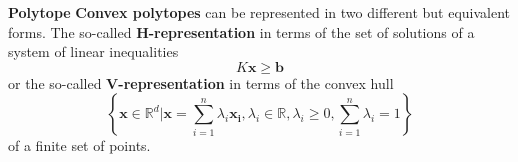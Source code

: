 \begin{frame}
\begin{block}{\textbf{Polytope}}
\textbf{Convex polytopes} can be represented in two different but equivalent forms. The so-called \textbf{H-representation} in terms of the set of solutions of a system of linear inequalities
$$K\mathbf{x} \geq \mathbf{b}$$
or the so-called \textbf{V-representation} in terms of the convex hull
$$\left\{ \mathbf{x} \in \mathbb{R}^d | \mathbf{x} = \sum_{i=1}^n \lambda_i \mathbf{x_i}, \lambda_i \in \mathbb{R}, \lambda_i \geq 0, \sum_{i=1}^n \lambda_i = 1  \right\} $$
of a finite set of points.
\end{block}
\end{frame}
